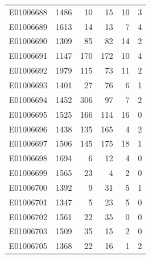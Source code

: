 \documentclass[
  letterpaper,
  DIV=11,
  numbers=noendperiod]{scrreprt}
\begin{document}
\begin{tabular}{lrrrrr}
E01006688     &    1486 &      10 &                    15 &                              10 &                       3 \\
E01006689     &    1613 &      14 &                    13 &                               7 &                       4 \\
E01006690     &    1309 &      85 &                    82 &                              14 &                       2 \\
E01006691     &    1147 &     170 &                   172 &                              10 &                       4 \\
E01006692     &    1979 &     115 &                    73 &                              11 &                       2 \\
E01006693     &    1401 &      27 &                    76 &                               6 &                       1 \\
E01006694     &    1452 &     306 &                    97 &                               7 &                       2 \\
E01006695     &    1525 &     166 &                   114 &                              16 &                       0 \\
E01006696     &    1438 &     135 &                   165 &                               4 &                       2 \\
E01006697     &    1506 &     145 &                   175 &                              18 &                       1 \\
E01006698     &    1694 &       6 &                    12 &                               4 &                       0 \\
E01006699     &    1565 &      23 &                     4 &                               2 &                       0 \\
E01006700     &    1392 &       9 &                    31 &                               5 &                       1 \\
E01006701     &    1347 &       5 &                    23 &                               5 &                       0 \\
E01006702     &    1561 &      22 &                    35 &                               0 &                       0 \\
E01006703     &    1509 &      35 &                    15 &                               2 &                       0 \\
E01006705     &    1368 &      22 &                    16 &                               1 &                       2 \\

\end{tabular}
\end{document}
